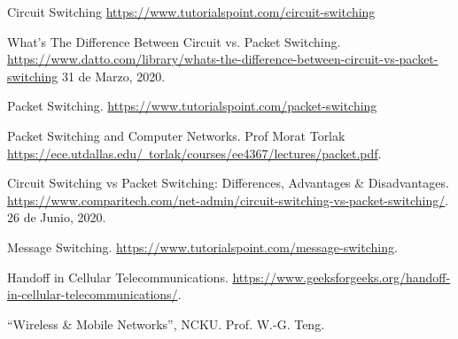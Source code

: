 \begin{thebibliography}{9}
Circuit Switching \href{https://www.tutorialspoint.com/circuit-switching}{https://www.tutorialspoint.com/circuit-switching}

What’s The Difference Between Circuit vs. Packet Switching. \href{https://www.datto.com/library/whats-the-difference-between-circuit-vs-packet-switching}{https://www.datto.com/library/whats-the-difference-between-circuit-vs-packet-switching} 31 de Marzo, 2020.


Packet Switching. \href{https://www.tutorialspoint.com/packet-switching}{https://www.tutorialspoint.com/packet-switching}



Packet Switching and Computer Networks. Prof Morat Torlak\\ \href{https://ece.utdallas.edu/~torlak/courses/ee4367/lectures/packet.pdf}{https://ece.utdallas.edu/~torlak/courses/ee4367/lectures/packet.pdf}.


Circuit Switching vs Packet Switching: Differences, Advantages \& Disadvantages. \href{https://www.comparitech.com/net-admin/circuit-switching-vs-packet-switching/}{https://www.comparitech.com/net-admin/circuit-switching-vs-packet-switching/}. 26 de Junio, 2020.


Message Switching. \href{https://www.tutorialspoint.com/message-switching}{https://www.tutorialspoint.com/message-switching}.


Handoff in Cellular Telecommunications. \href{https://www.geeksforgeeks.org/handoff-in-cellular-telecommunications/}{https://www.geeksforgeeks.org/handoff-in-cellular-telecommunications/}.

``Wireless \& Mobile Networks'', NCKU. Prof. W.-G. Teng. 

\end{thebibliography}

